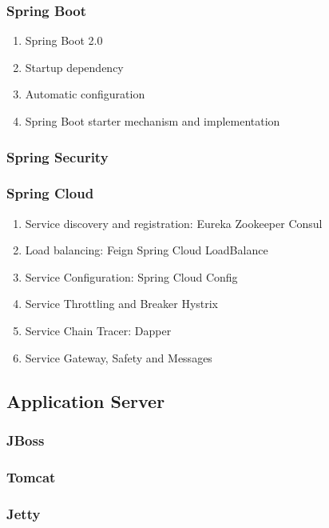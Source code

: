 \documentclass[11pt, twocolumn]{article}
\begin{document}
\subsubsection{Spring Boot}
\begin{enumerate}
	\item Spring Boot 2.0
	\item Startup dependency
	\item Automatic configuration
	\item Spring Boot starter mechanism and implementation
\end{enumerate}

\subsubsection{Spring Security}

\subsubsection{Spring Cloud}
\begin{enumerate}
	\item Service discovery and registration:
	\subitem Eureka
	\subitem Zookeeper
	\subitem Consul
	\item Load balancing:
	\subitem Feign
	\subitem Spring Cloud LoadBalance
	\item Service Configuration:
	\subitem Spring Cloud Config
	\item Service Throttling and Breaker
	\subitem Hystrix
	\item Service Chain Tracer:
	\subitem Dapper
	\item Service Gateway, Safety and Messages
\end{enumerate}

\subsection{Application Server}

\subsubsection{JBoss}

\subsubsection{Tomcat}

\subsubsection{Jetty}
\end{document}
